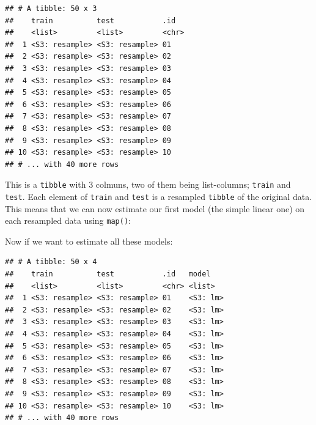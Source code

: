\documentclass[]{gitbook}
\newenvironment{Shaded}{\begin{snugshade}}{\end{snugshade}}
\newcommand{\DataTypeTok}[1]{\textcolor[rgb]{0.13,0.29,0.53}{#1}}
\newcommand{\KeywordTok}[1]{\textcolor[rgb]{0.13,0.29,0.53}{\textbf{#1}}}
\newcommand{\NormalTok}[1]{#1}
\newcommand{\OperatorTok}[1]{\textcolor[rgb]{0.81,0.36,0.00}{\textbf{#1}}}
\newcommand{\StringTok}[1]{\textcolor[rgb]{0.31,0.60,0.02}{#1}}
\theoremstyle{definition}
\theoremstyle{definition}
\theoremstyle{definition}
\theoremstyle{remark}
\begin{document}
\begin{verbatim}
## # A tibble: 50 x 3
##    train          test           .id  
##    <list>         <list>         <chr>
##  1 <S3: resample> <S3: resample> 01   
##  2 <S3: resample> <S3: resample> 02   
##  3 <S3: resample> <S3: resample> 03   
##  4 <S3: resample> <S3: resample> 04   
##  5 <S3: resample> <S3: resample> 05   
##  6 <S3: resample> <S3: resample> 06   
##  7 <S3: resample> <S3: resample> 07   
##  8 <S3: resample> <S3: resample> 08   
##  9 <S3: resample> <S3: resample> 09   
## 10 <S3: resample> <S3: resample> 10   
## # ... with 40 more rows
\end{verbatim}

This is a \texttt{tibble} with 3 colmuns, two of them being
list-columns; \texttt{train} and \texttt{test}. Each element of
\texttt{train} and \texttt{test} is a resampled \texttt{tibble} of the
original data. This means that we can now estimate our first model (the
simple linear one) on each resampled data using \texttt{map()}:

Now if we want to estimate all these models:

\begin{Shaded}
\end{Shaded}

\begin{verbatim}
## # A tibble: 50 x 4
##    train          test           .id   model   
##    <list>         <list>         <chr> <list>  
##  1 <S3: resample> <S3: resample> 01    <S3: lm>
##  2 <S3: resample> <S3: resample> 02    <S3: lm>
##  3 <S3: resample> <S3: resample> 03    <S3: lm>
##  4 <S3: resample> <S3: resample> 04    <S3: lm>
##  5 <S3: resample> <S3: resample> 05    <S3: lm>
##  6 <S3: resample> <S3: resample> 06    <S3: lm>
##  7 <S3: resample> <S3: resample> 07    <S3: lm>
##  8 <S3: resample> <S3: resample> 08    <S3: lm>
##  9 <S3: resample> <S3: resample> 09    <S3: lm>
## 10 <S3: resample> <S3: resample> 10    <S3: lm>
## # ... with 40 more rows
\end{verbatim}
\end{document}
